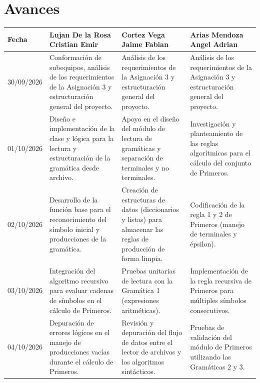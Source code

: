 \section{Avances}

\small
\begin{longtable}{|P{2cm}|P{4.4cm}|P{4.4cm}|P{4.4cm}|}
\hline
{}
{\color{white}\textbf{Fecha}} &
{\color{white}\textbf{Lujan De la Rosa Cristian Emir}} &
{\color{white}\textbf{Cortez Vega Jaime Fabian}} &
{\color{white}\textbf{Arias Mendoza Angel Adrian}} \\
\hline
\endhead

30/09/2026 &
  Conformación de subequipos, análisis de los requerimientos de la Asignación 3 y
  estructuración general del proyecto. &
  Análisis de los requerimientos de la Asignación 3 y estructuración general del proyecto. &
  Análisis de los requerimientos de la Asignación 3 y estructuración general del proyecto. \\[4pt]
\hline

01/10/2026 &
  Diseño e implementación de la clase y lógica para la lectura y estructuración de la
  gramática desde archivo. &
  Apoyo en el diseño del módulo de lectura de gramáticas y separación de terminales y no
  terminales. &
  Investigación y planteamiento de las reglas algorítmicas para el cálculo del conjunto de
  Primeros. \\[4pt]
\hline

02/10/2026 &
  Desarrollo de la función base para el reconocimiento del símbolo inicial y producciones
  de la gramática. &
  Creación de estructuras de datos (diccionarios y listas) para almacenar las reglas de
  producción de forma limpia. &
  Codificación de la regla 1 y 2 de Primeros (manejo de terminales y épsilon). \\[4pt]
\hline

03/10/2026 &
  Integración del algoritmo recursivo para evaluar cadenas de símbolos en el cálculo de
  Primeros. &
  Pruebas unitarias de lectura con la Gramática 1 (expresiones aritméticas). &
  Implementación de la regla recursiva de Primeros para múltiples símbolos consecutivos. \\[4pt]
\hline

04/10/2026 &
  Depuración de errores lógicos en el manejo de producciones vacías durante el cálculo de
  Primeros. &
  Revisión y depuración del flujo de datos entre el lector de archivos y los algoritmos
  sintácticos. &
  Pruebas de validación del módulo de Primeros utilizando las Gramáticas 2 y 3. \\[4pt]
\hline


\end{longtable}
